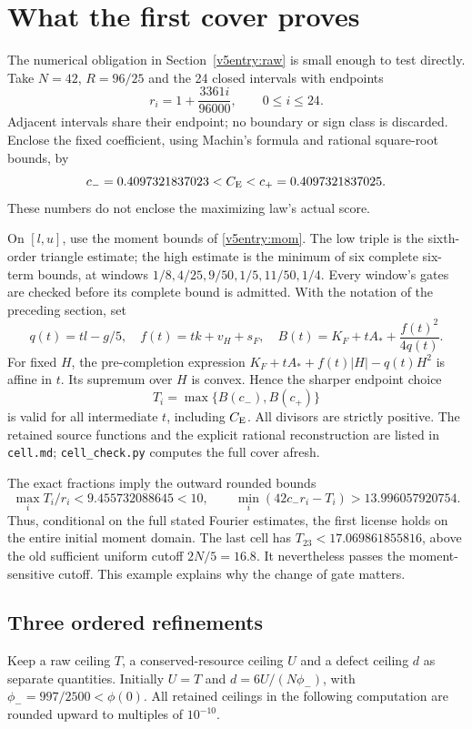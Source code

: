 \section{What the first cover proves}
\label{v5num:section}

The numerical obligation in Section~\ref{v5entry:raw} is small enough to
test directly. Take $N=42$, $R=96/25$ and the 24 closed intervals with
endpoints
\[
 r_i=1+\frac{3361i}{96000},\qquad 0\le i\le24.
\]
Adjacent intervals share their endpoint; no boundary or sign class is
discarded. Enclose the fixed coefficient, using Machin's formula and
rational square-root bounds, by
\[
 c_-=0.4097321837023<C_{\mathrm E}<c_+=0.4097321837025.
\]
These numbers do not enclose the maximizing law's actual score.

On $[l,u]$, use the moment bounds of \eqref{v5entry:mom}. The low
triple is the sixth-order triangle estimate; the high estimate is the
minimum of six complete six-term bounds, at windows
$1/8,4/25,9/50,1/5,11/50,1/4$. Every window's gates are checked before
its complete bound is admitted. With the notation of the preceding
section, set
\[
 q(t)=tl-g/5,\quad f(t)=tk+v_H+s_F,\quad
 B(t)=K_F+tA_*+\frac{f(t)^2}{4q(t)}.
\]
For fixed $H$, the pre-completion expression
$K_F+tA_*+f(t)|H|-q(t)H^2$ is affine in $t$.
Its supremum over $H$ is convex. Hence the sharper endpoint choice
\[
 T_i=\max\{B(c_-),B(c_+)\}
\]
is valid for all intermediate $t$, including $C_{\mathrm E}$. All divisors are
strictly positive. The retained source functions and the explicit rational
reconstruction are listed in \texttt{cell.md}; \texttt{cell\_check.py}
computes the full cover afresh.

The exact fractions imply the outward rounded bounds
\begin{equation}\label{v5num:raw-results}
 \max_i T_i/r_i<9.455732088645<10,\qquad
 \min_i(42c_-r_i-T_i)>13.996057920754.
\end{equation}
Thus, conditional on the full stated Fourier estimates, the first license
holds on the entire initial moment domain. The last cell has
$T_{23}<17.069861855816$, above the old sufficient uniform cutoff
$2N/5=16.8$. It nevertheless passes the moment-sensitive cutoff.
This example explains why the change of gate matters.

\subsection{Three ordered refinements}
Keep a raw ceiling $T$, a conserved-resource ceiling $U$ and a defect
ceiling $d$ as separate quantities. Initially $U=T$ and
$d=6U/(N\phi_-)$, with $\phi_-=997/2500<\phi(0)$.
All retained ceilings in the following computation are rounded upward
to multiples of $10^{-10}$.

